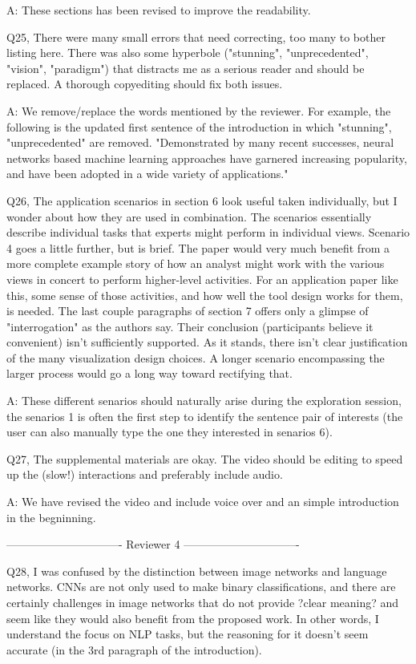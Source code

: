 A: These sections has been revised to improve the readability.

Q25, There were many small errors that need correcting, too many to bother listing here. There was also some hyperbole ("stunning", "unprecedented", "vision", "paradigm") that distracts me as a serious reader and should be replaced. A thorough copyediting should fix both issues.

A: We remove/replace the words mentioned by the reviewer. For example, the following is the updated first sentence of the introduction in which "stunning", "unprecedented" are removed. "Demonstrated by many recent successes, neural networks based machine learning approaches have garnered increasing popularity, and have been adopted in a wide variety of applications."


Q26, The application scenarios in section 6 look useful taken individually, but I wonder about how they are used in combination. The scenarios essentially describe individual tasks that experts might perform in individual views. Scenario 4 goes a little further, but is brief. The paper would very much benefit from a more complete example story of how an analyst might work with the various views in concert to perform higher-level activities. For an application paper like this, some sense of those activities, and how well the tool design works for them, is needed. The last couple paragraphs of section 7 offers only a glimpse of "interrogation" as the authors say.
Their conclusion (participants believe it convenient) isn't sufficiently supported. As it stands, there isn't clear justification of the many visualization design choices. A longer scenario encompassing the larger process would go a long way toward rectifying that.

A: These different senarios should naturally arise during the exploration session, the senarios 1 is often the first step to identify the sentence pair of interests (the user can also manually type the one they interested in senarios 6).

Q27, The supplemental materials are okay. The video should be editing to speed up the (slow!) interactions and preferably include audio.

A: We have revised the video and include voice over and an simple introduction in the begninning.


------------------------------- Reviewer 4 -------------------------------

Q28, I was confused by the distinction between image networks and language networks. CNNs are not only used to make binary classifications, and there are certainly challenges in image networks that do not provide ?clear meaning? and seem like they would also benefit from the proposed work. In other words, I understand the focus on NLP tasks, but the reasoning for it doesn't seem accurate (in the 3rd paragraph of the introduction).

